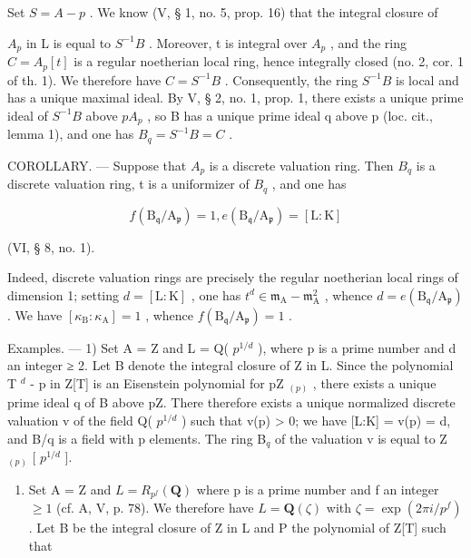 Set \(S = A - p\) . We know (V, § 1, no. 5, prop. 16) that the integral closure of

\(A_{p}\) in L is equal to \(S^{-1}B\) . Moreover, t is integral over \(A_{p}\) , and the ring \(C = A_{p}[t]\) is a regular noetherian local ring, hence integrally closed (no. 2, cor. 1 of th. 1). We therefore have \(C = S^{-1}B\) . Consequently, the ring \(S^{-1}B\) is local and has a unique maximal ideal. By V, § 2, no. 1, prop. 1, there exists a unique prime ideal of \(S^{-1}B\) above \(pA_{p}\) , so B has a unique prime ideal q above p (loc. cit., lemma 1), and one has \(B_{q} = S^{-1}B = C\) .

COROLLARY. --- Suppose that \(A_{p}\) is a discrete valuation ring. Then \(B_{q}\) is a discrete valuation ring, t is a uniformizer of \(B_{q}\) , and one has

\[
f (\mathrm{B} _ {\mathfrak {q}} / \mathrm{A} _ {\mathfrak {p}}) = 1, e (\mathrm{B} _ {\mathfrak {q}} / \mathrm{A} _ {\mathfrak {p}}) = [ \mathrm{L}: \mathrm{K} ]\tag{9}
\]

(VI, § 8, no. 1).

Indeed, discrete valuation rings are precisely the regular noetherian local rings of dimension 1; setting \(d = [\mathrm{L}:\mathrm{K}]\) , one has \(t^{d}\in\mathfrak{m}_{\mathrm{A}}-\mathfrak{m}_{\mathrm{A}}^{2}\) , whence \(d=e(\mathrm{B}_{\mathfrak{q}}/\mathrm{A}_{\mathfrak{p}})\) . We have \([\kappa_{\mathrm{B}}:\kappa_{\mathrm{A}}]=1\) , whence \(f(\mathrm{B}_{\mathfrak{q}}/\mathrm{A}_{\mathfrak{p}})=1\) .

Examples. --- 1) Set A = Z and L = Q( \(p^{1/d}\) ), where p is a prime number and d an integer ≥ 2. Let B denote the integral closure of Z in L. Since the polynomial T \(^{d}\) - p in Z{[}T{]} is an Eisenstein polynomial for pZ \(_{(p)}\) , there exists a unique prime ideal q of B above pZ. There therefore exists a unique normalized discrete valuation v of the field Q( \(p^{1/d}\) ) such that v(p) \textgreater{} 0; we have {[}L:K{]} = v(p) = d, and B/q is a field with p elements. The ring B\(_{q}\) of the valuation v is equal to Z \(_{(p)}\) {[} \(p^{1/d}\) {]}.

\begin{enumerate}
\def\labelenumi{\arabic{enumi})}
\setcounter{enumi}{1}
\tightlist
\item
  Set A = Z and \(L = R_{p^{f}}(\mathbf{Q})\) where p is a prime number and f an integer \(\geqslant 1\) (cf. A, V, p. 78). We therefore have \(L = \mathbf{Q}(\zeta)\) with \(\zeta = \exp(2\pi i/p^{f})\) . Let B be the integral closure of Z in L and P the polynomial of Z{[}T{]} such that
\end{enumerate}


